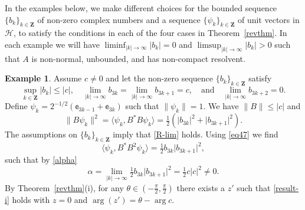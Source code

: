 \documentclass[12pt,a4paper]{article}
\numberwithin{equation}{section}
\theoremstyle{plain}
\theoremstyle{definition}
\newtheorem{example}[theorem]{Example}
\newcommand{\abs}[1]{\lvert{#1}\rvert}  %
\newcommand{\norm}[1]{\lVert{#1}\rVert} %
\newcommand{\ip}[2]{\langle{#1},{#2}\rangle} %
\newcommand{\cH}{\mathcal{H}}
\newcommand{\bZ}{\mathbf{Z}}
\DeclareMathOperator{\Arg}{arg}
\newcommand{\be}[1]{\mathsf{e}_{#1}}
\begin{document}
In the examples below, we make different choices for the bounded sequence $\{b_k\}_{k\in\bZ}$ of non-zero complex numbers and a sequence $\{\psi_k\}_{k\in\bZ}$ of unit vectors in $\cH$, to satisfy the conditions in each of the four cases in Theorem~\ref{revthm}. In each example we will have $\liminf_{\abs{k}\to\infty}\abs{b_k}=0$ and $\limsup_{\abs{k}\to\infty}\abs{b_k}>0$ such that $A$ is non-normal, unbounded, and has non-compact resolvent.

\begin{example}\label{ex43}
	Assume $c\neq0$ and let the non-zero sequence $\{b_k\}_{k\in\bZ}$ satisfy
	\begin{equation*}
		\sup_{k\in\bZ}\abs{b_k}\leq\abs{c}, \quad \lim_{\abs{k}\to\infty}b_{3k}=\lim_{\abs{k}\to\infty}b_{3k+1}=c, \quad\text{and}\quad \lim_{\abs{k}\to\infty}b_{3k+2}=0.
	\end{equation*}
	Define $\psi_k=2^{-1/2}(\be{3k-1}+\be{3k})$ such that $\norm{\psi_k}=1$. We have $\norm{B}\leq\abs{c}$ and
	\begin{equation*}
		\norm{B\psi_k}^2=\ip{\psi_k}{B^{\ast}B\psi_k}=\tfrac{1}{2}(\abs{b_{3k}}^2 + \abs{b_{3k+1}}^2).
	\end{equation*}
	The assumptions on $\{b_k\}_{k\in\bZ}$ imply that \eqref{R-lim} holds. Using \eqref{eq47} we find
	\begin{equation*}
		\ip{\psi_k}{B^{\ast}B^2\psi_k}=\tfrac{1}{2}	b_{3k}\abs{b_{3k+1}}^2,
	\end{equation*}
	such that by \eqref{alpha}
	\begin{equation*}
		\alpha=\lim_{\abs{k}\to\infty} \tfrac{1}{2}b_{3k}\abs{b_{3k+1}}^2=\tfrac{1}{2}c\abs{c}^2\neq0.
	\end{equation*}
	By Theorem~\ref{revthm}(i), for any $\theta\in(-\tfrac{\pi}{2},\tfrac{\pi}{2})$ there exists a $z'$ such that \eqref{result-i} holds with $z=0$ and $\Arg(z')=\theta-\Arg c$.
\end{example}
\end{document}
